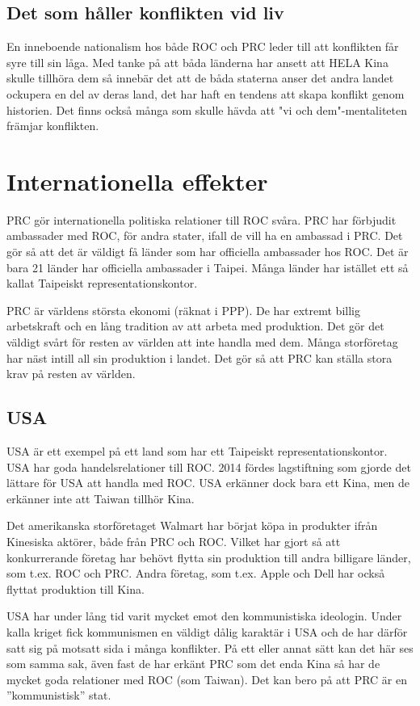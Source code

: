 \documentclass[a4paper,10pt]{article}
\begin{document}
\subsection*{Det som håller konflikten vid liv}
En inneboende nationalism hos både ROC och PRC leder till att konflikten får syre till sin låga. Med tanke på att båda länderna har ansett att HELA Kina skulle tillhöra dem så innebär det att de båda staterna anser det andra landet ockupera en del av deras land, det har haft en tendens att skapa konflikt genom historien. Det finns också många som skulle hävda att "vi och dem"-mentaliteten främjar konflikten.

\section*{Internationella effekter}
PRC gör internationella politiska relationer till ROC svåra. PRC har förbjudit ambassader med ROC, för andra stater, ifall de vill ha en ambassad i PRC. Det gör så att det är väldigt få länder som har officiella ambassader hos ROC. Det är bara 21 länder har officiella ambassader i Taipei. Många länder har istället ett så kallat Taipeiskt representationskontor. 

PRC är världens största ekonomi (räknat i PPP). De har extremt billig arbetskraft och en lång tradition av att arbeta med produktion. Det gör det väldigt svårt för resten av världen att inte handla med dem. Många storföretag har näst intill all sin produktion i landet. Det gör så att PRC kan ställa stora krav på resten av världen.

\subsection*{USA}
USA är ett exempel på ett land som har ett Taipeiskt representationskontor. USA har goda handelsrelationer till ROC. 2014 fördes lagstiftning som gjorde det lättare för USA att handla med ROC. USA erkänner dock bara ett Kina, men de erkänner inte att Taiwan tillhör Kina.

Det amerikanska storföretaget Walmart har börjat köpa in produkter ifrån Kinesiska aktörer, både från PRC och ROC. Vilket har gjort så att konkurrerande företag har behövt flytta sin produktion till andra billigare länder, som t.ex. ROC och PRC. Andra företag, som t.ex. Apple och Dell har också flyttat produktion till Kina.

USA har under lång tid varit mycket emot den kommunistiska ideologin. Under kalla kriget fick kommunismen en väldigt dålig karaktär i USA och de har därför satt sig på motsatt sida i många konflikter. På ett eller annat sätt kan det här ses som samma sak, även fast de har erkänt PRC som det enda Kina så har de mycket goda relationer med ROC (som Taiwan). Det kan bero på att PRC är en ''kommunistisk'' stat.
\end{document}
